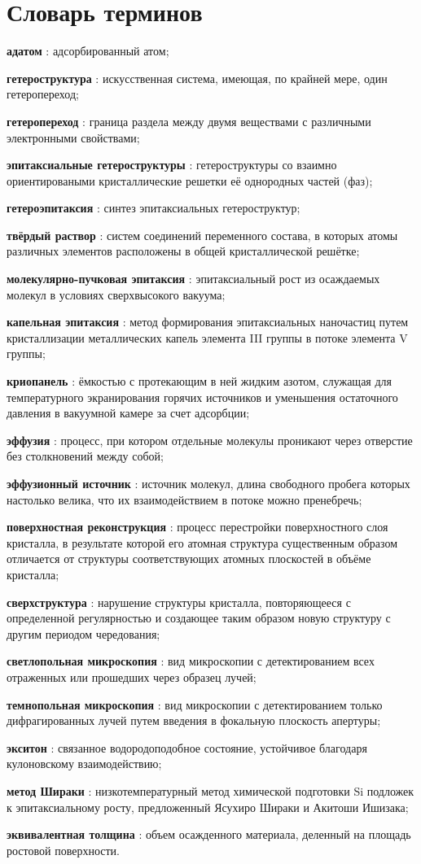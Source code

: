 \chapter*{Словарь терминов}             %
\textbf{адатом} : адсорбированный атом;

\textbf{гетероструктура} : искусственная система, имеющая, по крайней мере, один гетеропереход;

\textbf{гетеропереход} : граница раздела между двумя веществами с различными электронными свойствами;

\textbf{эпитаксиальные гетероструктуры} : гетероструктуры со взаимно ориентироваными кристаллические решетки её однородных частей (фаз);

\textbf{гетероэпитаксия} : синтез  эпитаксиальных гетероструктур;

\textbf{твёрдый раствор} : систем соединений переменного состава, в которых атомы различных элементов расположены в общей кристаллической решётке;

\textbf{молекулярно-пучковая эпитаксия} : эпитаксиальный рост из осаждаемых молекул в условиях сверхвысокого вакуума;

\textbf{капельная эпитаксия} : метод формирования эпитаксиальных наночастиц путем кристаллизации металлических капель элемента III группы в потоке элемента V группы;

\textbf{криопанель} : ёмкостью с протекающим в ней жидким азотом, служащая для температурного экранирования горячих источников и уменьшения остаточного давления в вакуумной камере за счет адсорбции;

\textbf{эффузия} : процесс, при котором отдельные молекулы проникают через отверстие без столкновений между собой;

\textbf{эффузионный источник} : источник молекул, длина свободного пробега которых настолько велика, что их взаимодействием в потоке можно пренебречь;

\textbf{поверхностная реконструкция} : процесс перестройки поверхностного слоя кристалла, в результате которой его атомная структура существенным образом отличается от структуры соответствующих атомных плоскостей в объёме кристалла;

\textbf{сверхструктура} : нарушение структуры кристалла, повторяющееся с определенной регулярностью и создающее таким образом новую структуру с другим периодом чередования;

\textbf{светлопольная микроскопия} : вид микроскопии с детектированием всех отраженных или прошедших через образец лучей;

\textbf{темнопольная микроскопия} : вид микроскопии с детектированием только дифрагированных лучей путем введения в фокальную плоскость апертуры;

\textbf{экситон} : связанное водородоподобное состояние, устойчивое благодаря кулоновскому взаимодействию;

\textbf{метод Шираки} : низкотемпературный метод химической подготовки Si подложек к эпитаксиальному росту, предложенный Ясухиро Шираки и Акитоши Ишизака;

\textbf{эквивалентная толщина} : объем осажденного материала, деленный на площадь ростовой поверхности.